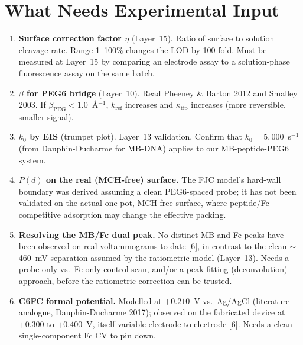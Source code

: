 \documentclass[10pt,a4paper]{article}
\numberwithin{equation}{section}
\newcommand{\cit}[1]{[#1]}
\begin{document}
\section{What Needs Experimental Input}

\begin{enumerate}[label=\arabic*.,leftmargin=*]
  \item \textbf{Surface correction factor $\eta$} (Layer~15). Ratio of surface
    to solution cleavage rate. Range 1--100\% changes the LOD by 100-fold. Must be
    measured at Layer~15 by comparing an electrode assay to a solution-phase
    fluorescence assay on the same batch.

  \item \textbf{$\beta$ for PEG6 bridge} (Layer~10). Read Pheeney \& Barton 2012
    and Smalley 2003. If $\beta_{\text{PEG}} < 1.0$~\AA$^{-1}$, $k_{\text{ref}}$
    increases and $\kappa_{\text{tip}}$ increases (more reversible, smaller signal).

  \item \textbf{$k_0$ by EIS} (trumpet plot). Layer~13 validation. Confirm that
    $k_0 = 5{,}000$~s$^{-1}$ (from Dauphin-Ducharme for MB-DNA) applies to our
    MB-peptide-PEG6 system.

  \item \textbf{$P(d)$ on the real (MCH-free) surface.} The FJC model's hard-wall
    boundary was derived assuming a clean PEG6-spaced probe; it has not been
    validated on the actual one-pot, MCH-free surface, where peptide/Fc
    competitive adsorption may change the effective packing.

  \item \textbf{Resolving the MB/Fc dual peak.} No distinct MB and Fc peaks
    have been observed on real voltammograms to date \cit{6}, in contrast
    to the clean $\sim$460~mV separation assumed by the ratiometric model
    (Layer~13). Needs a probe-only vs.\ Fc-only control scan, and/or a
    peak-fitting (deconvolution) approach, before the ratiometric
    correction can be trusted.

  \item \textbf{C6FC formal potential.} Modelled at $+0.210$~V vs.\ Ag/AgCl
    (literature analogue, Dauphin-Ducharme 2017); observed on the fabricated
    device at $+0.300$ to $+0.400$~V, itself variable electrode-to-electrode
    \cit{6}. Needs a clean single-component
    Fc CV to pin down.
\end{enumerate}
\end{document}
